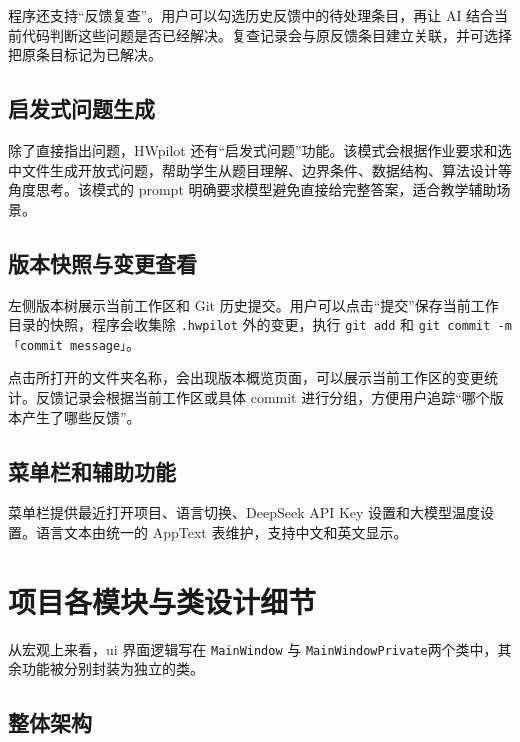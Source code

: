 \documentclass[UTF8,a4paper,11pt,fontset=fandol]{ctexart}
\begin{document}
程序还支持“反馈复查”。用户可以勾选历史反馈中的待处理条目，再让 AI 结合当前代码判断这些问题是否已经解决。复查记录会与原反馈条目建立关联，并可选择把原条目标记为已解决。

\subsection{启发式问题生成}

除了直接指出问题，HWpilot 还有“启发式问题”功能。该模式会根据作业要求和选中文件生成开放式问题，帮助学生从题目理解、边界条件、数据结构、算法设计等角度思考。该模式的 prompt 明确要求模型避免直接给完整答案，适合教学辅助场景。

\subsection{版本快照与变更查看}

左侧版本树展示当前工作区和 Git 历史提交。用户可以点击“提交”保存当前工作目录的快照，程序会收集除 \texttt{.hwpilot} 外的变更，执行 \texttt{git add} 和 \texttt{git commit -m 「commit message」}。

点击所打开的文件夹名称，会出现版本概览页面，可以展示当前工作区的变更统计。反馈记录会根据当前工作区或具体 commit 进行分组，方便用户追踪“哪个版本产生了哪些反馈”。

\subsection{菜单栏和辅助功能}

菜单栏提供最近打开项目、语言切换、DeepSeek API Key 设置和大模型温度设置。语言文本由统一的 AppText 表维护，支持中文和英文显示。

\section{项目各模块与类设计细节}

从宏观上来看，ui 界面逻辑写在 \texttt{MainWindow} 与 \texttt{MainWindowPrivate}两个类中，其余功能被分别封装为独立的类。

\subsection{整体架构}
\end{document}
